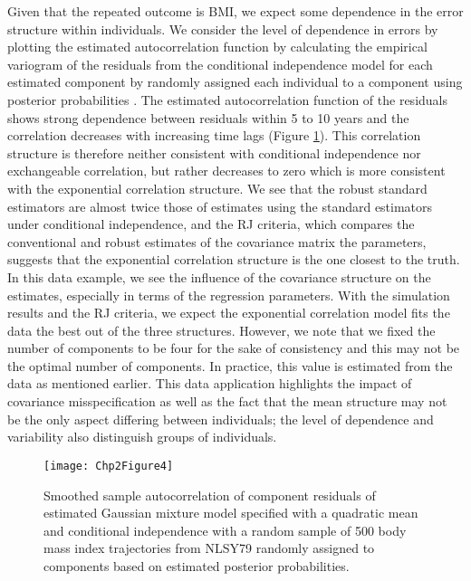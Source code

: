 \documentclass[10pt]{article}
\begin{document}
Given that the repeated outcome is BMI, we expect some dependence in the error structure within individuals.  We consider the level of dependence in errors by plotting the estimated autocorrelation function by calculating the empirical variogram of the residuals from the conditional independence model \cite{diggle2002} for each estimated component by randomly assigned each individual to a component using posterior probabilities \cite{wang2005}. The estimated autocorrelation function of the residuals shows strong dependence between residuals within 5 to 10 years and the correlation decreases with increasing time lags (Figure \ref{fig:2-4}). This correlation structure is therefore neither consistent with conditional independence nor exchangeable correlation, but rather decreases to zero which is more consistent with the exponential correlation structure. We see that the robust standard estimators are almost twice those of estimates using the standard estimators under conditional independence, and the RJ criteria, which compares the conventional and robust estimates of the covariance matrix the parameters, suggests that the exponential correlation structure is the one closest to the truth. \\

 In this data example, we see the influence of the covariance structure on the estimates, especially in terms of the regression parameters. With the simulation results and the RJ criteria, we expect the exponential correlation model fits the data the best out of the three structures. However, we note that we fixed the number of components to be four for the sake of consistency and this may not be the optimal number of components. In practice, this value is estimated from the data as mentioned earlier. This data application highlights the impact of covariance misspecification as well as the fact that the mean structure may not be the only aspect differing between individuals; the level of dependence and variability also distinguish groups of individuals. 
\begin{figure}
\begin{center}
\texttt{[image: Chp2Figure4]}
\end{center}
\caption{Smoothed sample autocorrelation of component residuals of estimated Gaussian mixture model specified with a quadratic mean and conditional independence with a random sample of 500 body mass index trajectories from NLSY79 randomly assigned to components based on estimated posterior probabilities. }
\label{fig:2-4}
\end{figure}
\end{document}

